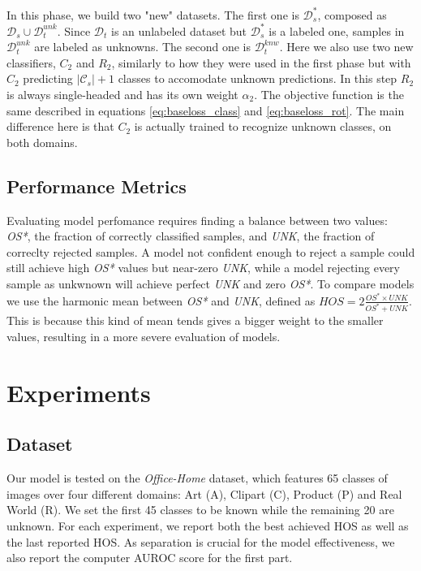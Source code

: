 \documentclass[10pt,twocolumn,letterpaper]{article}
\begin{document}
In this phase,
we build two "new" datasets.
The first one is $\mathcal{D}_s^*$, composed as $\mathcal{D}_s \cup \mathcal{D}_t^{unk}$.
Since $\mathcal{D}_t$ is an unlabeled dataset but $\mathcal{D}_s^*$ is a labeled one,
samples in $\mathcal{D}_t^{unk}$ are labeled as unknowns.
The second one is $\mathcal{D}_t^{knw}$.
Here we also use two new classifiers,
$C_2$ and $R_2$,
similarly to how they were used in the first phase but with $C_2$ predicting $|\mathcal{C}_s|+1$ classes to accomodate unknown predictions.
In this step $R_2$ is always single-headed and has its own weight $\alpha_2$.
The objective function is the same described in equations \ref{eq:baseloss_class} and \ref{eq:baseloss_rot}.
The main difference here is that $C_2$ is actually trained to recognize unknown classes,
on both domains.

\subsection{Performance Metrics}
\label{sec:performance_metrics}

Evaluating model perfomance requires finding a balance between two values:
{\it OS*}, 
the fraction of correctly classified samples,
and {\it UNK}, 
the fraction of correclty rejected samples.
A model not confident enough to reject a sample could still achieve high {\it OS*} values but near-zero {\it UNK},
while a model rejecting every  sample as unkwnown will achieve perfect {\it UNK} and zero {\it OS*}.
To compare models we use the harmonic mean between {\it OS*} and {\it UNK}, 
defined as $HOS = 2\frac{OS^*\times UNK}{OS^*+UNK}$.
This is because this kind of mean tends gives a bigger weight to the smaller values,
resulting in a more severe evaluation of models.

\section{Experiments}
\label{sec:experiments}

\subsection{Dataset}
\label{sec:dataset}

Our model is tested on the {\it Office-Home} dataset\cite{OfficeHomeDataset}, 
which features 65 classes of images over four different domains: Art (A), Clipart (C), Product (P) and Real World (R).
We set the first 45 classes to be known while the remaining 20 are unknown.
For each experiment, 
we report both the best achieved HOS as well as the last reported HOS.
As separation is crucial for the model effectiveness,
 we also report the computer AUROC score for the first part.
\end{document}
